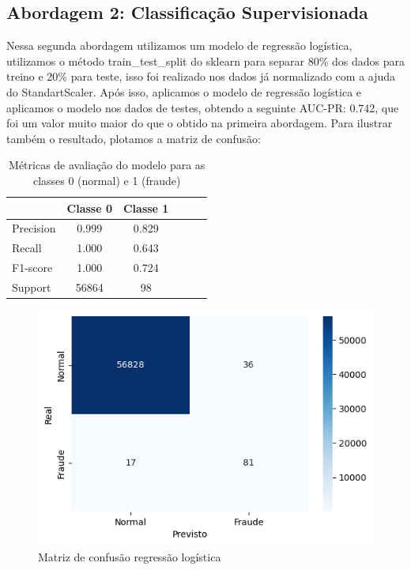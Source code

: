 \documentclass[conference]{IEEEtran}
\begin{document}
\subsection{Abordagem 2: Classificação Supervisionada}
\label{subsec:abordagem2}
  Nessa segunda abordagem utilizamos um modelo de regressão logística, utilizamos o método train\_test\_split do sklearn para separar 80\% dos dados para treino e 20\% para teste, isso foi realizado nos dados já normalizado com a ajuda do StandartScaler. Após isso, aplicamos o modelo de regressão logística e aplicamos o modelo nos dados de testes, obtendo a seguinte AUC-PR: 0.742, que foi um valor muito maior do que o obtido na primeira abordagem. Para ilustrar também o resultado, plotamos a matriz de confusão:
\begin{table}[tb]
    \caption{Métricas de avaliação do modelo para as classes 0 (normal) e 1 (fraude)}
    \label{tab:metricas_classificacao}
    \centering
    \begin{tabular}{lccccc}
        \toprule
        & \textbf{Classe 0} & \textbf{Classe 1} \\
        \midrule
        Precision   & 0.999 & 0.829 \\
        Recall      & 1.000 & 0.643 \\ 
        F1-score    & 1.000 & 0.724 \\
        Support     & 56864 & 98 \\
        \bottomrule
    \end{tabular}
\end{table}
  \begin{figure}[H]
    \centerline{\includegraphics[width=0.8\linewidth]{../output/matriz de confusao sem threshold regressao logistica.png}}
    \caption{Matriz de confusão regressão logística}
    \label{fig:matriz_confusao_regressao_logistica}
  \end{figure}
\end{document}
